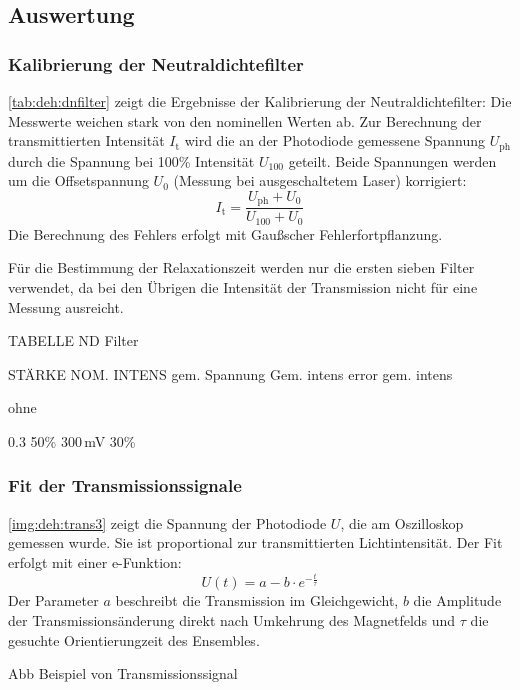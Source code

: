\subsection{Auswertung}

\subsubsection*{Kalibrierung der Neutraldichtefilter}

\autoref{tab:deh:dnfilter} zeigt die Ergebnisse der Kalibrierung der Neutraldichtefilter:
Die Messwerte weichen stark von den nominellen Werten ab.
Zur Berechnung der transmittierten Intensität $I_\text{t}$ wird
die an der Photodiode gemessene Spannung $U_{\text{ph}}$
durch die Spannung bei 100\% Intensität $U_{100}$ geteilt.
Beide Spannungen werden um die Offsetspannung $U_{0}$ (Messung bei ausgeschaltetem Laser) korrigiert:
\begin{equation}
  I_\text{t}=\frac{U_{\text{ph}}+U_{0}}{U_{100}+U_{0}}
\end{equation}
Die Berechnung des Fehlers erfolgt mit Gaußscher Fehlerfortpflanzung.

Für die Bestimmung der Relaxationszeit werden nur die ersten sieben Filter verwendet,
da bei den Übrigen die Intensität der Transmission nicht für eine Messung ausreicht.


TABELLE ND Filter


STÄRKE		NOM. INTENS 	gem. Spannung		Gem. intens 	error gem. intens

ohne 

0.3	 			50\%			300\,mV				30\%


\subsubsection*{Fit der Transmissionssignale}
\autoref{img:deh:trans3} zeigt die Spannung der Photodiode $U$, die am Oszilloskop gemessen wurde.
Sie ist proportional zur transmittierten Lichtintensität.
Der Fit erfolgt mit einer e-Funktion:
\begin{equation}
  U(t)=a - b \cdot e^{-\frac{t}{\tau}}
\end{equation}
Der Parameter $a$ beschreibt die Transmission im Gleichgewicht, $b$ die Amplitude der
Transmissionsänderung direkt nach Umkehrung des Magnetfelds und $\tau$ die gesuchte Orientierungzeit des Ensembles.


Abb Beispiel von Transmissionssignal
 

